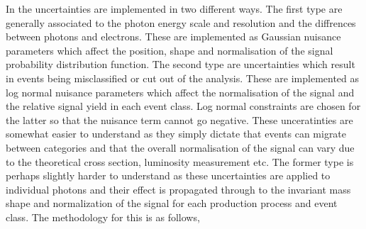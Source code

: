 In the \MFM uncertainties are implemented in two different ways. The first type are generally associated to the photon energy scale and resolution and the diffrences between photons and electrons. These are implemented as Gaussian nuisance parameters which affect the position, shape and normalisation of the signal probability distribution function. The second type are uncertainties which result in events being misclassified or cut out of the analysis. These are implemented as log normal nuisance parameters which affect the normalisation of the signal and the relative signal yield in each event class. Log normal constraints are chosen for the latter so that the nuisance term cannot go negative. These unceratinties are somewhat easier to understand as they simply dictate that events can migrate between categories and that the overall normalisation of the signal can vary due to the theoretical cross section, luminosity measurement etc. The former type is perhaps slightly harder to understand as these uncertainties are applied to individual photons and their effect is propagated through to the invariant mass shape and normalization of the signal for each production process and event class. The methodology for this is as follows,

